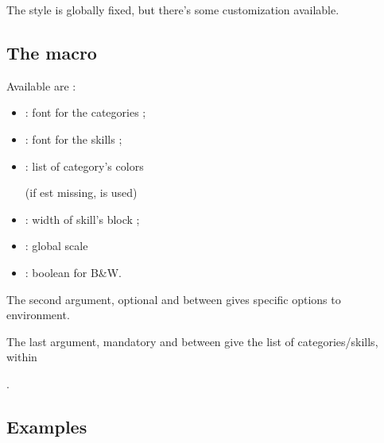 \documentclass[english,11pt,a4paper]{article}
\begin{document}
The style is globally fixed, but there's some customization available.

\subsection{The macro}

Available  are :

\begin{itemize}
	\item {} : font for the categories ;
	\item {} : font for the skills ;
	\item {} : list of category's colors
	
	
	(if  est missing,  is used)
	\item {} : width of skill's block ;
	\item {} : global scale
	\item {} : boolean for B\&W.
\end{itemize}

The second argument, optional and between  gives specific options to  environment.

\smallskip

The last argument, mandatory and between  give the list of categories/skills, within

.

\subsection{Examples}

\begin{demohigh}[language=latex/latex3,style/main=teal!25,style/code=teal!25]
\end{demohigh}

\begin{demohigh}[language=latex/latex3,style/main=teal!25,style/code=teal!25]
\end{demohigh}
\end{document}
